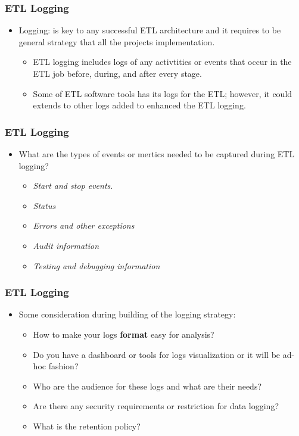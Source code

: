 \begin{frame}
	\frametitle{ETL Logging}
	\begin{itemize}[<+->]
		\item Logging: is key to any successful ETL architecture and it requires to be general strategy that all the projects implementation.
		
		\begin{itemize}[<+->]
			\item  ETL logging includes logs of any activtities or events that occur in the ETL job before, during, and after every stage. 
			\item Some of ETL software tools has its logs for the ETL; however, it could extends to other logs added to enhanced the ETL logging. 					
		\end{itemize}
	\end{itemize}
\end{frame}


\begin{frame}
	\frametitle{ETL Logging}
	\begin{itemize}[<+->]

	\item What are the types of events or mertics needed to be captured during ETL logging?
		\begin{itemize}[<+->]
				
			\item \textit{Start and stop events}. 
			\item \textit{Status}
			\item \textit{Errors and other exceptions}
			\item \textit{Audit information}
			\item \textit{Testing and debugging information}
		\end{itemize}
	\end{itemize}
\end{frame}


\begin{frame}
	\frametitle{ETL Logging}
	\begin{itemize}[<+->]
		
		\item Some consideration during building of the logging strategy:
		\begin{itemize}[<+->]
			\item How to make your logs \textbf{format} easy for analysis? 
			\item Do you have a dashboard or tools for logs visualization or it will be ad-hoc fashion?
			\item Who are the audience for these logs and what are their needs?
			\item Are there any security requirements or restriction for data logging?
			\item What is the retention policy?
		\end{itemize}
	\end{itemize}
\end{frame}


